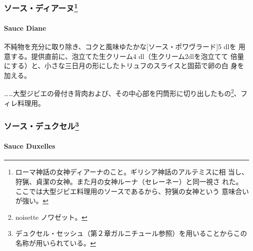 \maeaki

\hypertarget{ux30bdux30fcux30b9ux30c7ux30a3ux30a2ux30fcux30cc28}{%
\subsubsection[ソース・ディアーヌ]{\texorpdfstring{ソース・ディアーヌ\footnote{ローマ神話の女神ディアーナのこと。ギリシア神話のアルテミスに相
  当し、狩猟、貞潔の女神。また月の女神ルーナ（セレーネー）と同一視さ
  れた。ここでは大型ジビエ料理用のソースであるから、狩猟の女神という
  意味合いが強い。}}{ソース・ディアーヌ}}\label{ux30bdux30fcux30b9ux30c7ux30a3ux30a2ux30fcux30cc28}}

\hypertarget{sauce-diane}{%
\paragraph{Sauce Diane}\label{sauce-diane}}

 

不純物を充分に取り除き、コクと風味ゆたかな{[}ソース・ポワヴラード{]}5
dlを 用意する。提供直前に、泡立てた生クリーム4
dl（生クリーム2dlを泡立てて
倍量にする）と、小さな三日月の形にしたトリュフのスライスと固茹で卵の白
身を加える。

\ldots{}\ldots{}大型ジビエの骨付き背肉および、その中心部を円筒形に切り出したもの\footnote{noisette
  ノワゼット。}、フィレ料理用。

\maeaki

\hypertarget{ux30bdux30fcux30b9ux30c7ux30e5ux30afux30bbux30eb29}{%
\subsubsection[ソース・デュクセル]{\texorpdfstring{ソース・デュクセル\footnote{デュクセル・セッシュ（第２章ガルニチュール参照）を用いることからこの名称が用いられている。}}{ソース・デュクセル}}\label{ux30bdux30fcux30b9ux30c7ux30e5ux30afux30bbux30eb29}}

\hypertarget{sauce-duxelles}{%
\paragraph{Sauce Duxelles}\label{sauce-duxelles}}


